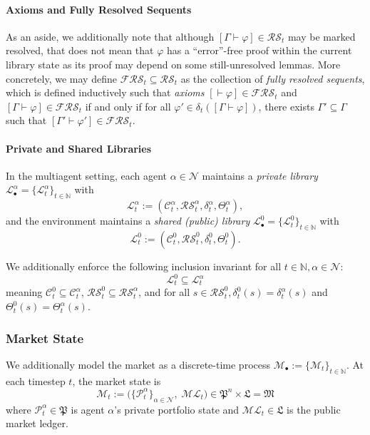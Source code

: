 \documentclass[letterpaper]{article} %
\renewcommand{\phi}{\varphi}
\newcommand{\proves}{\vdash}
\begin{document}
\paragraph{Axioms and Fully Resolved Sequents}

As an aside, we additionally note that although $[\Gamma \proves \phi] \in \mathcal{RS}_t$ may be marked resolved, that does not mean that $\phi$ has a ``error''-free proof within the current library state as its proof may depend on some still-unresolved lemmas. More concretely, we may define $\mathcal{FRS}_t \subseteq \mathcal{RS}_t$ as the collection of \textit{fully resolved sequents}, which is defined inductively such that \textit{axioms} $[\proves \phi] \in \mathcal{FRS}_t$ and $[\Gamma \proves \phi] \in \mathcal{FRS}_t$ if and only if for all $\phi' \in \delta_t([\Gamma \proves \phi])$, there exists $\Gamma'\subseteq \Gamma$ such that $[\Gamma' \proves \phi'] \in \mathcal{FRS}_t$.


\paragraph{Private and Shared Libraries}
In the multiagent setting, each agent $\alpha\in\mathcal{N}$ maintains a \textit{private library} $\mathcal{L}_\bullet^\alpha = \{\mathcal{L}^\alpha_t\}_{t\in\mathbb{N}}$ with
\[
\mathcal{L}^\alpha_t := (\mathcal{C}^\alpha_t,\mathcal{RS}^\alpha_t,\delta^\alpha_t,\Theta_t^\alpha),
\]
and the environment maintains a \textit{shared (public) library} $\mathcal{L}_\bullet^0 = \{\mathcal{L}^0_t\}_{t\in\mathbb{N}}$ with
\[
\mathcal{L}^0_t := (\mathcal{C}^0_t,\mathcal{RS}^0_t,\delta^0_t, \Theta_t^0).
\]

We additionally enforce the following inclusion invariant for all $t \in \mathbb{N}, \alpha \in \mathcal{N}$:
\[
\mathcal{L}^0_t \subseteq \mathcal{L}^\alpha_t
\]
meaning $\mathcal{C}^0_t\subseteq \mathcal{C}^\alpha_t$, $\mathcal{RS}^0_t\subseteq \mathcal{RS}^\alpha_t$, and for all $s\in \mathcal{RS}_t^0, \delta^0_t(s) = \delta^\alpha_t(s)$ and $\Theta^0_t(s)=\Theta^\alpha_t(s)$.


\subsubsection{Market State}

We additionally model the market as a discrete-time process $\mathcal{M}_\bullet := \{\mathcal{M}_t\}_{t\in\mathbb{N}}$.
At each timestep $t$, the market state is
\[
\mathcal{M}_t := \big(\{\mathcal{P}^\alpha_t\}_{\alpha\in\mathcal{N}},\;\mathcal{ML}_t\big)
\in \mathfrak{P}^n \times \mathfrak{L} = \mathfrak{M}\]
where $\mathcal{P}^\alpha_t\in\mathfrak{P}$ is agent $\alpha$'s private portfolio state and $\mathcal{ML}_t \in \mathfrak{L}$
is the public market ledger.
\end{document}
